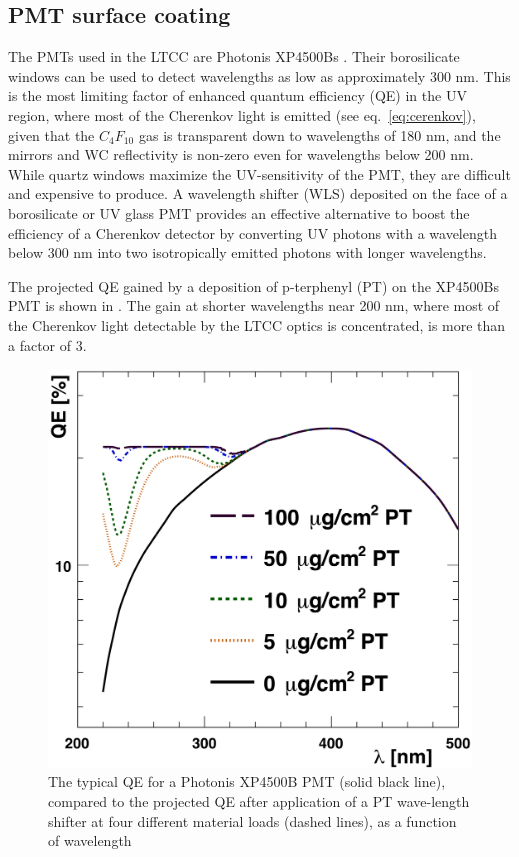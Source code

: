 \subsection{PMT surface coating}

The PMTs used in the LTCC are Photonis XP4500Bs \cite{Photonis:2007ta}.
Their borosilicate windows can be used to detect wavelengths as low as approximately
300 nm. This is the most limiting factor of enhanced quantum efficiency (QE) in the UV region, where most of the Cherenkov
light is emitted (see eq.~\ref{eq:cerenkov}), given that the $C_4F_{10}$ gas is transparent down to
wavelengths of 180 nm, and the mirrors and WC reflectivity is non-zero
even for wavelengths below 200 nm.
While quartz windows maximize the UV-sensitivity of the PMT, they are difficult and expensive to produce.
A wavelength shifter (WLS) deposited on the face of a borosilicate or UV glass
PMT provides an effective alternative to boost the efficiency of a Cherenkov
detector by converting UV photons with a wavelength below 300 nm into two
isotropically emitted photons with longer wavelengths.

The projected QE gained by a deposition of p-terphenyl (PT) on the XP4500Bs
PMT \cite{Koczon:1457653} is shown in .
The gain at shorter wavelengths near 200 nm, where most of the Cherenkov light
detectable by the LTCC optics is concentrated, is more than a factor of 3.


\begin{figure}
	\centering
	\includegraphics[width=0.99\columnwidth, height=0.75\columnwidth]{img/pmtQuantumEfficiencyGain.png}
	\caption{The typical QE for a Photonis XP4500B PMT (solid black line), compared to the projected QE after application
			 of a PT wave-length shifter at four different material loads (dashed lines), as a function of wavelength}
	\label{fig:pmtQuantumEfficiencyGainAndExample}
\end{figure}

